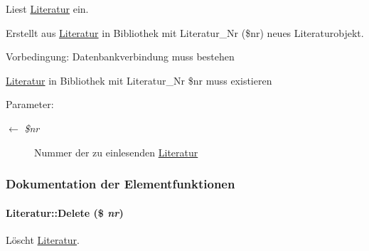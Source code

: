 Liest \hyperlink{classLiteratur}{Literatur} ein. 

Erstellt aus \hyperlink{classLiteratur}{Literatur} in Bibliothek mit Literatur\_\-Nr (\$nr) neues Literaturobjekt. \begin{Desc}
\item[Vorbedingung:]Datenbankverbindung muss bestehen 

\hyperlink{classLiteratur}{Literatur} in Bibliothek mit Literatur\_\-Nr \$nr muss existieren \end{Desc}
\begin{Desc}
\item[Parameter:]
\begin{description}
\item[\mbox{$\leftarrow$} {\em \$nr}]Nummer der zu einlesenden \hyperlink{classLiteratur}{Literatur} \end{description}
\end{Desc}


\subsubsection{Dokumentation der Elementfunktionen}
\hypertarget{classLiteratur_f5b265d349df2a9d17079b81d808fa89}{
\paragraph[Delete]{\setlength{\rightskip}{0pt plus 5cm}Literatur::Delete (\$ {\em nr})}\hfill}
\label{classLiteratur_f5b265d349df2a9d17079b81d808fa89}


Löscht \hyperlink{classLiteratur}{Literatur}. 

